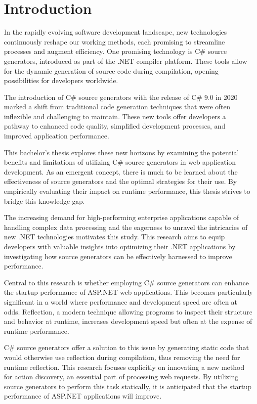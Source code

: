\chapter{Introduction}

In the rapidly evolving software development landscape, new technologies continuously reshape our working methods, each promising to streamline processes and augment efficiency. One promising technology is C\# source generators, introduced as part of the .NET compiler platform. These tools allow for the dynamic generation of source code during compilation, opening possibilities for developers worldwide.

The introduction of C\# source generators with the release of C\# 9.0 in 2020 marked a shift from traditional code generation techniques that were often inflexible and challenging to maintain. These new tools offer developers a pathway to enhanced code quality, simplified development processes, and improved application performance.

This bachelor's thesis explores these new horizons by examining the potential benefits and limitations of utilizing C\# source generators in web application development. As an emergent concept, there is much to be learned about the effectiveness of source generators and the optimal strategies for their use. By empirically evaluating their impact on runtime performance, this thesis strives to bridge this knowledge gap.

The increasing demand for high-performing enterprise applications capable of handling complex data processing and the eagerness to unravel the intricacies of new .NET technologies motivates this study. This research aims to equip developers with valuable insights into optimizing their .NET applications by investigating how source generators can be effectively harnessed to improve performance.

Central to this research is whether employing C\# source generators can enhance the startup performance of ASP.NET web applications. This becomes particularly significant in a world where performance and development speed are often at odds. Reflection, a modern technique allowing programs to inspect their structure and behavior at runtime, increases development speed but often at the expense of runtime performance.

C\# source generators offer a solution to this issue by generating static code that would otherwise use reflection during compilation, thus removing the need for runtime reflection. This research focuses explicitly on innovating a new method for action discovery, an essential part of processing web requests. By utilizing source generators to perform this task statically, it is anticipated that the startup performance of ASP.NET applications will improve. 

